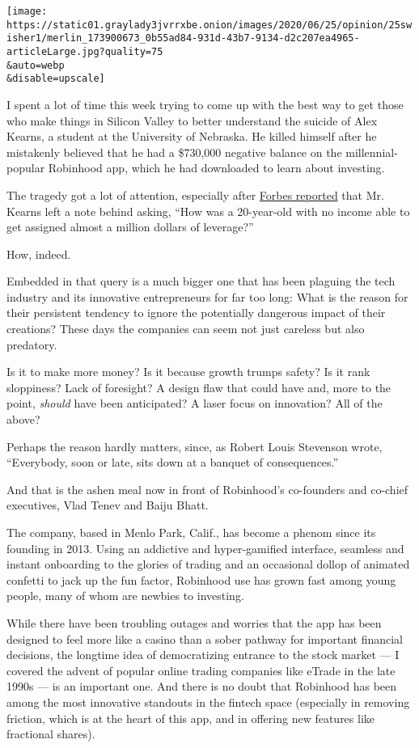 \texttt{[image: https://static01.graylady3jvrrxbe.onion/images/2020/06/25/opinion/25swisher1/merlin\_173900673\_0b55ad84-931d-43b7-9134-d2c207ea4965-articleLarge.jpg?quality=75\\\&auto=webp\\\&disable=upscale]}

I spent a lot of time this week trying to come up with the best way to
get those who make things in Silicon Valley to better understand the
suicide of Alex Kearns, a student at the University of Nebraska. He
killed himself after he mistakenly believed that he had a \$730,000
negative balance on the millennial-popular Robinhood app, which he had
downloaded to learn about investing.

The tragedy got a lot of attention, especially after
\href{https://www.forbes.com/sites/sergeiklebnikov/2020/06/17/20-year-old-robinhood-customer-dies-by-suicide-after-seeing-a-730000-negative-balance/\#7b4952da1638}{Forbes
reported} that Mr. Kearns left a note behind asking, ``How was a
20-year-old with no income able to get assigned almost a million dollars
of leverage?''

How, indeed.

Embedded in that query is a much bigger one that has been plaguing the
tech industry and its innovative entrepreneurs for far too long: What is
the reason for their persistent tendency to ignore the potentially
dangerous impact of their creations? These days the companies can seem
not just careless but also predatory.

Is it to make more money? Is it because growth trumps safety? Is it rank
sloppiness? Lack of foresight? A design flaw that could have and, more
to the point, \emph{should} have been anticipated? A laser focus on
innovation? All of the above?

Perhaps the reason hardly matters, since, as Robert Louis Stevenson
wrote, ``Everybody, soon or late, sits down at a banquet of
consequences.''

And that is the ashen meal now in front of Robinhood's co-founders and
co-chief executives, Vlad Tenev and Baiju Bhatt.

The company, based in Menlo Park, Calif., has become a phenom since its
founding in 2013. Using an addictive and hyper-gamified interface,
seamless and instant onboarding to the glories of trading and an
occasional dollop of animated confetti to jack up the fun factor,
Robinhood use has grown fast among young people, many of whom are
newbies to investing.

While there have been troubling outages and worries that the app has
been designed to feel more like a casino than a sober pathway for
important financial decisions, the longtime idea of democratizing
entrance to the stock market --- I covered the advent of popular online
trading companies like eTrade in the late 1990s --- is an important one.
And there is no doubt that Robinhood has been among the most innovative
standouts in the fintech space (especially in removing friction, which
is at the heart of this app, and in offering new features like
fractional shares).

